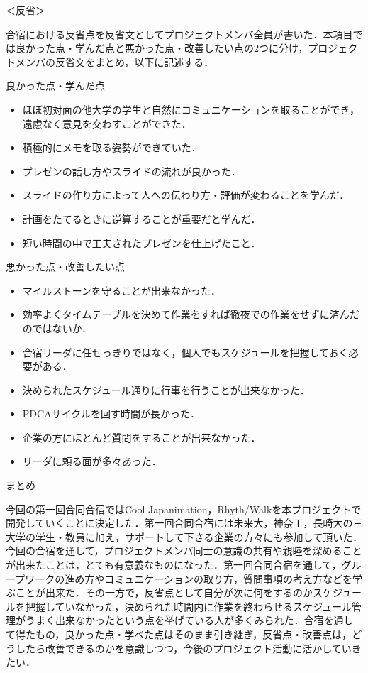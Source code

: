 \par
＜反省＞
\par
合宿における反省点を反省文としてプロジェクトメンバ全員が書いた．本項目では良かった点・学んだ点と悪かった点・改善したい点の2つに分け，プロジェクトメンバの反省文をまとめ，以下に記述する．
\par
良かった点・学んだ点
\begin{itemize}
\item ほぼ初対面の他大学の学生と自然にコミュニケーションを取ることができ，遠慮なく意見を交わすことができた．
\item 積極的にメモを取る姿勢ができていた．
\item プレゼンの話し方やスライドの流れが良かった．
\item スライドの作り方によって人への伝わり方・評価が変わることを学んだ．
\item 計画をたてるときに逆算することが重要だと学んだ．
\item 短い時間の中で工夫されたプレゼンを仕上げたこと．
\end{itemize}
\par
悪かった点・改善したい点
\begin{itemize}
\item マイルストーンを守ることが出来なかった．
\item 効率よくタイムテーブルを決めて作業をすれば徹夜での作業をせずに済んだのではないか．
\item 合宿リーダに任せっきりではなく，個人でもスケジュールを把握しておく必要がある．
\item 決められたスケジュール通りに行事を行うことが出来なかった．
\item PDCAサイクルを回す時間が長かった．
\item 企業の方にほとんど質問をすることが出来なかった．
\item リーダに頼る面が多々あった．
\end{itemize}
\par
まとめ
\par
今回の第一回合同合宿ではCool Japanimation，Rhyth/Walkを本プロジェクトで開発していくことに決定した．第一回合同合宿には未来大，神奈工，長崎大の三大学の学生・教員に加え，サポートして下さる企業の方々にも参加して頂いた．今回の合宿を通して，プロジェクトメンバ同士の意識の共有や親睦を深めることが出来たことは，とても有意義なものになった．第一回合同合宿を通して，グループワークの進め方やコミュニケーションの取り方，質問事項の考え方などを学ぶことが出来た．その一方で，反省点として自分が次に何をするのかスケジュールを把握していなかった，決められた時間内に作業を終わらせるスケジュール管理がうまく出来なかったという点を挙げている人が多くみられた．合宿を通して得たもの，良かった点・学べた点はそのまま引き継ぎ，反省点・改善点は，どうしたら改善できるのかを意識しつつ，今後のプロジェクト活動に活かしていきたい．

